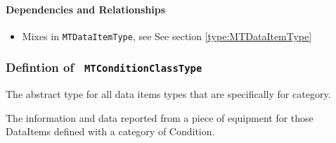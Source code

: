 \paragraph{Dependencies and Relationships}

\begin{itemize}
\item Mixes in \texttt{MTDataItemType}, see See section \ref{type:MTDataItemType}
\end{itemize}
\FloatBarrier
\subsubsection{Defintion of \texttt{ MTConditionClassType}}
  \label{type:MTConditionClassType}

\FloatBarrier

The abstract type for all data items types that are specifically for  \gls{category}.

The information and data reported from a piece of equipment for those DataItems defined with a  category of Condition.

